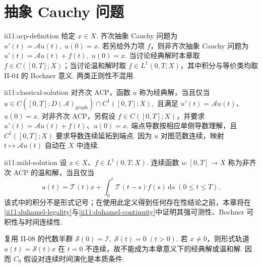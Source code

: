 \section{抽象 Cauchy 问题}\label{sec:ii11-acp}

\begin{FADefinition}{ii11:acp-definition}
给定 \(\displaystyle x\in X\). 齐次抽象 Cauchy 问题为 \(\displaystyle u'(t)=\mathcal Au(t), \; u(0)=x.\)
若另给外力项 \(\displaystyle f\)，则非齐次抽象 Cauchy 问题为 \(\displaystyle u'(t)=\mathcal Au(t)+f(t), \; u(0)=x.\)
当讨论经典解时本章取 \(\displaystyle f\in C([0,T];X)\)；当讨论温和解时取 \(\displaystyle f\in L^1(0,T;X)\)，其中积分与等价类均取 II-04 的 Bochner 意义. 两类正则性不混用.
\end{FADefinition}

\begin{FADefinition}[A][经典解]{ii11:classical-solution}
对齐次 ACP，函数 \(\displaystyle u\) 称为经典解，当且仅当 \(\displaystyle u\in C([0,T];D(\mathcal A)_{\mathrm{graph}})\cap C^1([0,T];X),\)
且满足 \(\displaystyle u'(t)=\mathcal Au(t)\)、\(\displaystyle u(0)=x\). 对非齐次 ACP，另假设 \(\displaystyle f\in C([0,T];X)\)，并要求 \(\displaystyle u'(t)=\mathcal Au(t)+f(t)\)、\(\displaystyle u(0)=x\). 端点导数按相应单侧导数理解，且 \(\displaystyle C^1([0,T];X)\) 要求导数连续延拓到端点. 因为 \(\displaystyle u\) 对图范数连续，映射 \(\displaystyle t\mapsto\mathcal Au(t)\) 自动在 \(\displaystyle X\) 中连续.
\end{FADefinition}

\begin{FADefinition}[A][温和解]{ii11:mild-solution}
设 \(\displaystyle x\in X\)、\(\displaystyle f\in L^1(0,T;X)\). 连续函数 \(\displaystyle u:[0,T]\to X\) 称为非齐次 ACP 的温和解，当且仅当
\[
u(t)
=
\mathcal T(t)x
+
\int_0^t\mathcal T(t-s)f(s)\,\mathrm{d}s
\;
(0\leqslant t\leqslant T).
\]
该式中的积分不是形式记号；在使用此定义得到任何存在性结论之前，本章将在\autoref{ii11:duhamel-legality}与\autoref{ii11:duhamel-continuity}中证明其强可测性、Bochner 可积性与时间连续性.
\end{FADefinition}

\begin{FACounterexample}\label{ii11:nonc0-acp-failure}
复用 II-08 的代数半群 \(\displaystyle \mathcal S(0)=\mathcal I, \; \mathcal S(t)=0 \;(t>0).\)
若 \(\displaystyle x\neq0\)，则形式轨道 \(\displaystyle u(t)=\mathcal S(t)x\) 在 \(\displaystyle t=0\) 不连续，故不能成为本章意义下的经典解或温和解. 因而 \(\displaystyle C_0\) 假设对连续时间演化是本质条件.
\end{FACounterexample}

